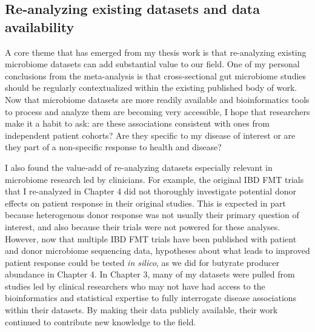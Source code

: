 


\subsection{Re-analyzing existing datasets and data availability}

A core theme that has emerged from my thesis work is that re-analyzing existing microbiome datasets can add substantial value to our field.
One of my personal conclusions from the meta-analysis is that cross-sectional gut microbiome studies should be regularly contextualized within the existing published body of work.
Now that microbiome datasets are more readily available and bioinformatics tools to process and analyze them are becoming very accessible, I hope that researchers make it a habit to ask: are these associations consistent with ones from independent patient cohorts? Are they specific to my disease of interest or are they part of a non-specific response to health and disease?

I also found the value-add of re-analyzing datasets especially relevant in microbiome research led by clinicians.
For example, the original IBD FMT trials that I re-analyzed in Chapter 4 did not thoroughly investigate potential donor effects on patient response in their original studies.
This is expected in part because heterogenous donor response was not usually their primary question of interest, and also because their trials were not powered for these analyses.
However, now that multiple IBD FMT trials have been published with patient and donor microbiome sequencing data, hypotheses about what leads to improved patient response could be tested \textit{in silico}, as we did for butyrate producer abundance in Chapter 4.
In Chapter 3, many of my datasets were pulled from studies led by clinical researchers who may not have had access to the bioinformatics and statistical expertise to fully interrogate disease associations within their datasets.
By making their data publicly available, their work continued to contribute new knowledge to the field.

